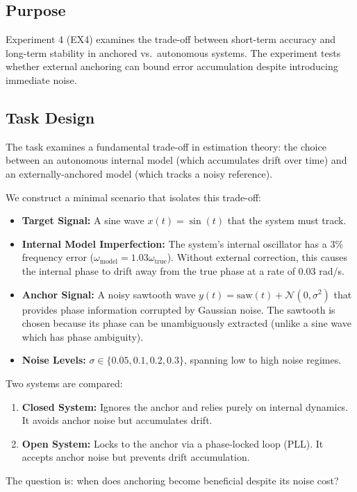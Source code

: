 \documentclass{article}
\begin{document}
\subsection{Purpose}
Experiment 4 (EX4) examines the trade-off between short-term accuracy and long-term stability in anchored vs.\ autonomous systems. The experiment tests whether external anchoring can bound error accumulation despite introducing immediate noise.

\subsection{Task Design}
The task examines a fundamental trade-off in estimation theory: the choice between an autonomous internal model (which accumulates drift over time) and an externally-anchored model (which tracks a noisy reference).

We construct a minimal scenario that isolates this trade-off:
\begin{itemize}
    \item \textbf{Target Signal:} A sine wave $x(t) = \sin(t)$ that the system must track.
    \item \textbf{Internal Model Imperfection:} The system's internal oscillator has a 3\% frequency error ($\omega_{\text{model}} = 1.03\omega_{\text{true}}$). Without external correction, this causes the internal phase to drift away from the true phase at a rate of $0.03$ rad/s.
    \item \textbf{Anchor Signal:} A noisy sawtooth wave $y(t) = \text{saw}(t) + \mathcal{N}(0, \sigma^2)$ that provides phase information corrupted by Gaussian noise. The sawtooth is chosen because its phase can be unambiguously extracted (unlike a sine wave which has phase ambiguity).
    \item \textbf{Noise Levels:} $\sigma \in \{0.05, 0.1, 0.2, 0.3\}$, spanning low to high noise regimes.
\end{itemize}

Two systems are compared:
\begin{enumerate}
    \item \textbf{Closed System:} Ignores the anchor and relies purely on internal dynamics. It avoids anchor noise but accumulates drift.
    \item \textbf{Open System:} Locks to the anchor via a phase-locked loop (PLL). It accepts anchor noise but prevents drift accumulation.
\end{enumerate}

The question is: when does anchoring become beneficial despite its noise cost?
\end{document}
